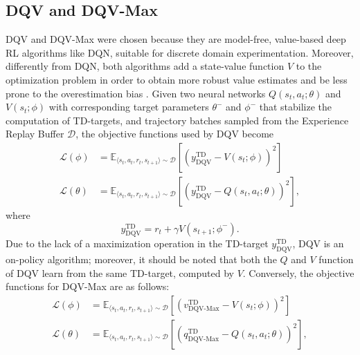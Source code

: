 \subsection{DQV and DQV-Max}
DQV and DQV-Max were chosen because they are model-free, value-based
deep RL algorithms like DQN, suitable for discrete domain
experimentation. Moreover, differently from DQN, both algorithms add
a state-value function $V$ to the optimization problem in order to
obtain more robust value estimates and be less prone to the
overestimation bias \citep{sabatelli2020deep}. Given two neural
networks $Q\left(s_t,a_t;\theta\right)$ and $V\left(s_t;\phi\right)$
with corresponding target parameters $\theta^-$ and $\phi^-$ that
stabilize the computation of TD-targets, and trajectory batches
sampled from the Experience Replay Buffer $\mathcal{D}$, the objective
functions used by DQV become
\begin{align}
\mathcal{L}\left(\phi\right)&=\mathbb{E}_{\langle
                              s_t,a_t,r_t,s_{t+1}\rangle\sim
                              \mathcal{D}}\left[{\left(y^{\scriptscriptstyle
                              \textrm{TD}}_{\scriptscriptstyle
                              \textrm{DQV}}-V\left(s_t;\phi\right)\right)}^2\right]
  \\
\mathcal{L}\left(\theta\right)&=\mathbb{E}_{\langle
                                s_t,a_t,r_t,s_{t+1}\rangle\sim
                                \mathcal{D}}\left[{\left(y^{\scriptscriptstyle
                                \textrm{TD}}_{\scriptscriptstyle
                                \textrm{DQV}}-Q\left(s_t,a_t;\theta\right)\right)}^2\right],
\end{align}
where
\begin{equation}
  y^{\scriptscriptstyle \textrm{TD}}_{\scriptscriptstyle
    \textrm{DQV}}=r_t+\gamma V\left(s_{t+1};\phi^{-}\right).
\end{equation}
Due to the lack of a maximization operation in the TD-target
$y^{\scriptscriptstyle \textrm{TD}}_{\scriptscriptstyle
  \textrm{DQV}}$, DQV is an on-policy algorithm; moreover, it should
be noted that both the $Q$ and $V$ function of DQV learn from the same
TD-target, computed by $V$. Conversely, the objective functions for
DQV-Max are as follows:
\begin{align}
\mathcal{L}\left(\phi\right)&=\mathbb{E}_{\langle
                              s_t,a_t,r_t,s_{t+1}\rangle\sim
                              \mathcal{D}}\left[{\left(v^{\scriptscriptstyle
                              \textrm{TD}}_{\scriptscriptstyle
                              \textrm{DQV-Max}}-V\left(s_t;\phi\right)\right)}^2\right]
  \\
\mathcal{L}\left(\theta\right)&=\mathbb{E}_{\langle
                                s_t,a_t,r_t,s_{t+1}\rangle\sim
                                \mathcal{D}}\left[{\left(q^{\scriptscriptstyle
                                \textrm{TD}}_{\scriptscriptstyle
                                \textrm{DQV-Max}}-Q\left(s_t,a_t;\theta\right)\right)}^2\right],
\end{align}

